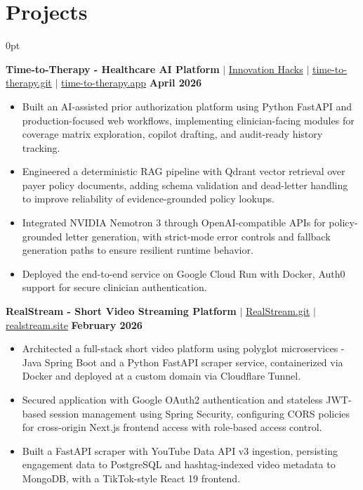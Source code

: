 \documentclass[letterpaper,10pt]{article}
\newlength{\contentindent}
\newcommand{\sectioncontent}[1]{%
  \begin{adjustwidth}{\contentindent}{0pt}%
  #1%
  \end{adjustwidth}%
}
\begin{document}
\section{Projects}
\sectioncontent{

\textbf{Time-to-Therapy - Healthcare AI Platform} $|$ \href{https://www.innovationhacks.dev/}{Innovation Hacks} $|$ \href{https://github.com/Saurav-Kalaskar/time-to-therapy}{time-to-therapy.git} $|$ \href{https://time-to-therapy-4todzcphia-uc.a.run.app/}{time-to-therapy.app} \hfill \textbf{April 2026}
\begin{itemize}
    \item Built an AI-assisted prior authorization platform using Python FastAPI and production-focused web workflows, implementing clinician-facing modules for coverage matrix exploration, copilot drafting, and audit-ready history tracking.
    \item Engineered a deterministic RAG pipeline with Qdrant vector retrieval over payer policy documents, adding schema validation and dead-letter handling to improve reliability of evidence-grounded policy lookups.
    \item Integrated NVIDIA Nemotron 3 through OpenAI-compatible APIs for policy-grounded letter generation, with strict-mode error controls and fallback generation paths to ensure resilient runtime behavior.
    \item Deployed the end-to-end service on Google Cloud Run with Docker, Auth0 support for secure clinician authentication.
\end{itemize}

\textbf{RealStream - Short Video Streaming Platform} $|$ \href{https://github.com/Saurav-Kalaskar/RealStream.git}{RealStream.git} $|$ \href{https://realstream.site/}{realstream.site} \hfill \textbf{February 2026}
\begin{itemize}
    \item Architected a full-stack short video platform using polyglot microservices - Java Spring Boot and a Python FastAPI scraper service, containerized via Docker and deployed at a custom domain via Cloudflare Tunnel.
    \item Secured application with Google OAuth2 authentication and stateless JWT-based session management using Spring Security, configuring CORS policies for cross-origin Next.js frontend access with role-based access control.
    \item Built a FastAPI scraper with YouTube Data API v3 ingestion, persisting engagement data to PostgreSQL and hashtag-indexed video metadata to MongoDB, with a TikTok-style React 19 frontend.
\end{itemize}

}
\end{document}
